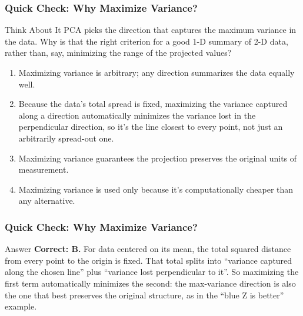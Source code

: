 \begin{frame}[fragile]\frametitle{Quick Check: Why Maximize Variance?}
\begin{block}{Think About It}
PCA picks the direction that captures the maximum variance in the data. Why is that the
right criterion for a good 1-D summary of 2-D data, rather than, say, minimizing the range
of the projected values?
\begin{enumerate}
  \item[A.] Maximizing variance is arbitrary; any direction summarizes the data equally well.
  \item[B.] Because the data's total spread is fixed, maximizing the variance captured along
  a direction automatically minimizes the variance lost in the perpendicular direction, so
  it's the line closest to every point, not just an arbitrarily spread-out one.
  \item[C.] Maximizing variance guarantees the projection preserves the original units of
  measurement.
  \item[D.] Maximizing variance is used only because it's computationally cheaper than any
  alternative.
\end{enumerate}
\end{block}
\end{frame}

\begin{frame}[fragile]\frametitle{Quick Check: Why Maximize Variance?}
\begin{block}{Answer}
\textbf{Correct: B.} For data centered on its mean, the total squared distance from every
point to the origin is fixed. That total splits into ``variance captured along the chosen
line'' plus ``variance lost perpendicular to it''. So maximizing the first term automatically
minimizes the second: the max-variance direction is also the one that best preserves the
original structure, as in the ``blue Z is better'' example.
\end{block}
\end{frame}


